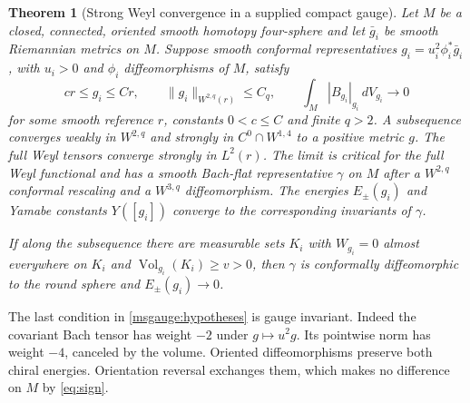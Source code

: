 \documentclass[11pt]{article}
\numberwithin{equation}{section}
\newtheorem{theorem}{Theorem}[section]
\theoremstyle{definition}
\theoremstyle{remark}
\DeclareMathOperator{\Vol}{Vol}
\begin{document}
\begin{theorem}[Strong Weyl convergence in a supplied compact gauge]
\label{msgauge:compact}
Let \(M\) be a closed, connected, oriented smooth homotopy four-sphere
and let \(\bar g_i\) be smooth Riemannian metrics on \(M\). Suppose
smooth conformal representatives \(g_i=u_i^2\phi_i^*\bar g_i\), with
\(u_i>0\) and \(\phi_i\) diffeomorphisms of \(M\), satisfy
\begin{equation}\label{msgauge:hypotheses}
 c r\le g_i\le C r,\qquad
 \|g_i\|_{W^{2,q}(r)}\le C_q,\qquad
 \int_M |B_{g_i}|_{g_i}\,dV_{g_i}\longrightarrow0
\end{equation}
for some smooth reference \(r\), constants \(0<c\le C\) and finite
\(q>2\). A subsequence converges weakly in \(W^{2,q}\) and strongly in
\(C^0\cap W^{1,4}\) to a positive metric \(g\). The full Weyl tensors
converge strongly in \(L^2(r)\). The limit is critical for the full
Weyl functional and has a smooth Bach-flat representative \(\gamma\)
on \(M\) after a \(W^{2,q}\) conformal rescaling and a \(W^{3,q}\)
diffeomorphism. The energies \(E_\pm(g_i)\) and Yamabe constants
\(Y([g_i])\) converge to the corresponding invariants of \(\gamma\).

If along the subsequence there are measurable sets \(K_i\) with
\(W_{g_i}=0\) almost everywhere on \(K_i\) and
\(\Vol_{g_i}(K_i)\ge v>0\), then \(\gamma\) is conformally
diffeomorphic to the round sphere and \(E_\pm(g_i)\to0\).
\end{theorem}

The last condition in \eqref{msgauge:hypotheses} is gauge invariant.
Indeed the covariant Bach tensor has weight \(-2\) under \(g\mapsto
u^2g\). Its pointwise norm has weight \(-4\), canceled by the volume.
Oriented diffeomorphisms preserve both chiral energies. Orientation
reversal exchanges them, which makes no difference on \(M\) by
\eqref{eq:sign}.
\end{document}
